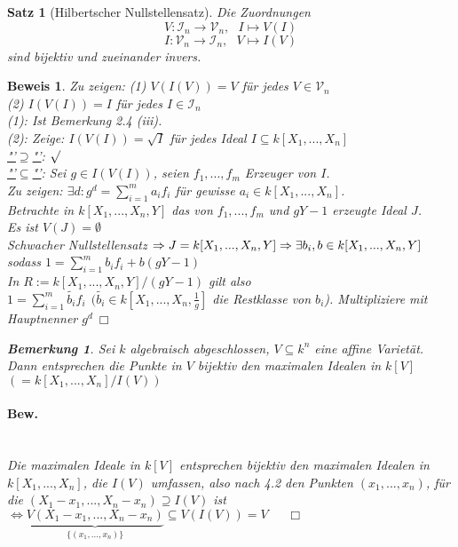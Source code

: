 \documentclass[a4paper,12pt]{report}
\theoremstyle{break}
\newtheorem{Satz}{Satz}
\newtheorem{Bem}[Def]{Bemerkung}
\theoremstyle{nonumberbreak}
\newtheorem{Bew}{Beweis}
\theoremstyle{nonumberplain}
\begin{document}
\begin{Satz}[Hilbertscher Nullstellensatz]
Die Zuordnungen
$$V: \mathcal{I}_n \rightarrow \mathcal{V}_n,~~~I\mapsto V(I)$$
$$I: \mathcal{V}_n \rightarrow \mathcal{I}_n,~~~V\mapsto I(V)$$
sind bijektiv und zueinander invers.
\end{Satz}
\begin{Bew}
Zu zeigen: (1) $V(I(V))=V$ für jedes $V\in \mathcal{V}_n$\\
(2) $I(V(I))=I$ für jedes $I\in \mathcal{I}_n$\\
(1): Ist Bemerkung 2.4 (iii).\\
(2): Zeige: $I(V(I))= \sqrt{I}$ für jedes Ideal $I\subseteq k[X_1,...,X_n]$\\
\underline{"'$\supseteq$"'}: $\surd$\\
\underline{"'$\subseteq$"'}: Sei $g\in I(V(I))$, seien $f_1,...,f_m$ Erzeuger von $I$.\\
Zu zeigen: $\exists d:g^d=\sum_{i=1}^m a_if_i$ für gewisse $a_i\in k[X_1,...,X_n]$.\\
Betrachte in $k[X_1,...,X_n,Y]$ das von $f_1,...,f_m$ und $gY-1$ erzeugte Ideal $J$.\\
Es ist $V(J)=\emptyset$\\
Schwacher Nullstellensatz $\Rightarrow J=k[X_1,...,X_n,Y]\\
\Rightarrow \exists b_i,b \in k[X_1,...,X_n,Y]$ sodass $1=\sum_{i=1}^m b_if_i + b(gY-1)$\\
In $R:= k[X_1,...,X_n,Y]/(gY-1)$ gilt also\\
$1=\sum_{i=1}^m\tilde{b_i}f_i~~ (\tilde{b_i}\in k[X_1,...,X_n,\frac{1}{g}]$ die Restklasse von $b_i$). Multipliziere mit Hauptnenner $g^d~\Box$
\begin{Bem}
Sei $k$ algebraisch abgeschlossen, $V\subseteq k^n$ eine affine Varietät. Dann entsprechen die Punkte in $V$ bijektiv den maximalen Idealen in $k[V]$ $(=k[X_1,...,X_n]/ I(V))$
\end{Bem}
\paragraph{Bew.}~\\
Die maximalen Ideale in $k[V]$ entsprechen bijektiv den maximalen Idealen in $k[X_1,...,X_n]$, die $I(V)$ umfassen, also nach 4.2 den Punkten $(x_1,...,x_n)$, für die $(X_1-x_1,...,X_n-x_n)\supseteq I(V)$ ist\\
$\Leftrightarrow \underbrace{V(X_1-x_1,...,X_n-x_n)}_{\{(x_1,...,x_n)\}}\subseteq V(I(V))= V ~~~~~~~\Box$

\end{Bew}
\end{document}
